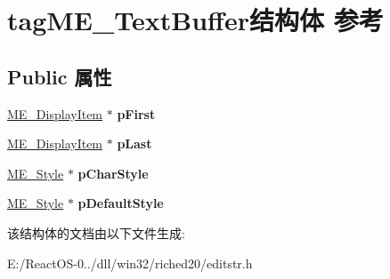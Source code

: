\hypertarget{structtag_m_e___text_buffer}{}\section{tag\+M\+E\+\_\+\+Text\+Buffer结构体 参考}
\label{structtag_m_e___text_buffer}
\subsection*{Public 属性}
\begin{DoxyCompactItemize}
\item 
\mbox{\label{structtag_m_e___text_buffer_a2725a4b7d37df39f0d1c0d1b3369bc7f}} 
\hyperlink{structtag_m_e___display_item}{M\+E\+\_\+\+Display\+Item} $\ast$ {\bfseries p\+First}
\item 
\mbox{\label{structtag_m_e___text_buffer_ac88ecc8731887e082f889e3ef4979503}} 
\hyperlink{structtag_m_e___display_item}{M\+E\+\_\+\+Display\+Item} $\ast$ {\bfseries p\+Last}
\item 
\mbox{\label{structtag_m_e___text_buffer_a917918d2c3e765f909e3e2d606ea7471}} 
\hyperlink{structtag_m_e___style}{M\+E\+\_\+\+Style} $\ast$ {\bfseries p\+Char\+Style}
\item 
\mbox{\label{structtag_m_e___text_buffer_a46a471b04082fc044a2cc9c16c4774e1}} 
\hyperlink{structtag_m_e___style}{M\+E\+\_\+\+Style} $\ast$ {\bfseries p\+Default\+Style}
\end{DoxyCompactItemize}


该结构体的文档由以下文件生成\+:\begin{DoxyCompactItemize}
\item 
E\+:/\+React\+O\+S-\/0../dll/win32/riched20/editstr.\+h\end{DoxyCompactItemize}
